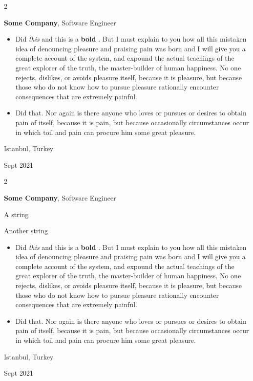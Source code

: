 \documentclass[10pt, letterpaper]{article}
\newenvironment{summary}{
    \begin{description}[
        topsep=0.10 cm,
        parsep=0.10 cm,
        partopsep=0pt,
        itemsep=0pt,
        leftmargin=0.4 cm + 10pt
    ]
}{
    \end{description}
} %
\newenvironment{highlights}{
    \begin{itemize}[
        topsep=0.10 cm,
        parsep=0.10 cm,
        partopsep=0pt,
        itemsep=0pt,
        leftmargin=0.4 cm + 10pt
    ]
}{
    \end{itemize}
} %
\newenvironment{twocolentry}[2][]{
    \onecolentry
    \def\secondColumn{#2}
    \setcolumnwidth{\fill, 4.5 cm}
    \begin{paracol}{2}
}{
    \switchcolumn \raggedleft \secondColumn
    \end{paracol}
    \endonecolentry
} %
\let\hrefWithoutArrow\href
\renewcommand{\href}[2]{\hrefWithoutArrow{#1}{\ifthenelse{\equal{#2}{}}{ }{#2 }\raisebox{.15ex}{\footnotesize \faExternalLink*}}}
\begin{document}
        \begin{twocolentry}{
            Istanbul, Turkey

        Sept 2021
        }
            \textbf{Some \textnormal{Company}}, Software Engineer
            \begin{highlights}
                \item Did \textit{this} and this is a \textbf{bold} \href{https://example.com}{link}. But I must explain to you how all this mistaken idea of denouncing pleasure and praising pain was born and I will give you a complete account of the system, and expound the actual teachings of the great explorer of the truth, the master-builder of human happiness. No one rejects, dislikes, or avoids pleasure itself, because it is pleasure, but because those who do not know how to pursue pleasure rationally encounter consequences that are extremely painful.
                \item Did that. Nor again is there anyone who loves or pursues or desires to obtain pain of itself, because it is pain, but because occasionally circumstances occur in which toil and pain can procure him some great pleasure.
            \end{highlights}
        \end{twocolentry}


        \vspace{0.2 cm}

        \begin{twocolentry}{
            Istanbul, Turkey

        Sept 2021
        }
            \textbf{Some \textnormal{Company}}, Software Engineer
            \begin{summary}
                \item A string
                \item Another string
            \end{summary}
            \begin{highlights}
                \item Did \textit{this} and this is a \textbf{bold} \href{https://example.com}{link}. But I must explain to you how all this mistaken idea of denouncing pleasure and praising pain was born and I will give you a complete account of the system, and expound the actual teachings of the great explorer of the truth, the master-builder of human happiness. No one rejects, dislikes, or avoids pleasure itself, because it is pleasure, but because those who do not know how to pursue pleasure rationally encounter consequences that are extremely painful.
                \item Did that. Nor again is there anyone who loves or pursues or desires to obtain pain of itself, because it is pain, but because occasionally circumstances occur in which toil and pain can procure him some great pleasure.
            \end{highlights}
        \end{twocolentry}
\end{document}
